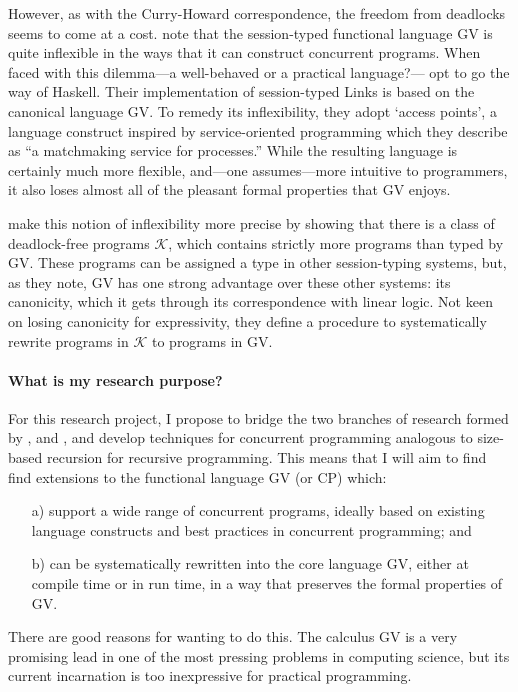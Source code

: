\documentclass{scrartcl}
\begin{document}
However, as with the Curry-Howard correspondence, the freedom from
deadlocks seems to come at a cost.
\citet{lindley2015lightweight} note that the session-typed functional language
GV is quite inflexible in the ways that it can construct concurrent programs.
When faced with this dilemma---a well-behaved or a practical
language?---\citet{lindley2015lightweight} opt to go the way of Haskell.
Their implementation of session-typed Links is based on the canonical
language GV. To remedy its inflexibility, they adopt `access points',
a language construct inspired by service-oriented programming which
they describe as ``a matchmaking service for processes.'' While the
resulting language is certainly much more flexible, and---one
assumes---more intuitive to programmers, it also loses almost all of
the pleasant formal properties that GV enjoys.

\citet{dardha2015} make this notion of inflexibility more precise by
showing that there is a class of deadlock-free programs $\mathscr{K}$,
which contains strictly more programs than typed by GV. These programs
can be assigned a type in other session-typing systems, but, as they
note, GV has one strong advantage over these other systems: its
canonicity, which it gets through its correspondence with linear
logic. Not keen on losing canonicity for expressivity, they define a
procedure to systematically rewrite programs in $\mathscr{K}$ to
programs in GV.

\paragraph{What is my research purpose?}
For this research project, I propose to bridge the two branches of
research formed by \citet{lindley2015lightweight}, and \citet{dardha2015}, and
develop techniques for concurrent programming analogous to size-based
recursion for recursive programming.
This means that I will aim to find find extensions to the functional
language GV (or CP) which:
\begin{enumerate}
\item[a)]%
  support a wide range of concurrent programs, ideally based on
  existing language constructs and best practices in concurrent
  programming; and
\item[b)]%
  can be systematically rewritten into the core language GV, either at
  compile time or in run time, in a way that preserves the formal
  properties of GV.
\end{enumerate}
There are good reasons for wanting to do this. The calculus GV is
a very promising lead in one of the most pressing problems in
computing science, but its current incarnation is too inexpressive for
practical programming.
\end{document}
